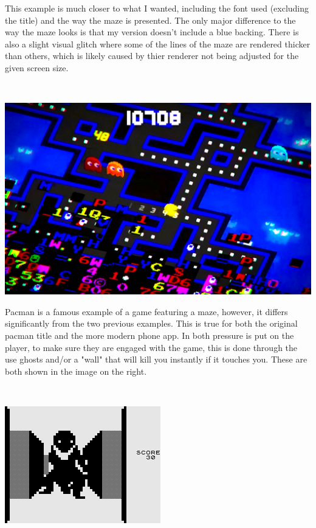 \documentclass{article}
\begin{document}
\begin{minipage}{0.5\textwidth}\raggedright
This example is much closer to what I wanted, including the font used (excluding the title) and the way the maze is presented. The only major difference to the way
the maze looks is that my version doesn't include a blue backing. There is also a slight visual glitch where some of the lines of the maze are rendered thicker than others,
which is likely caused by thier renderer not being adjusted for the given screen size.
\end{minipage}
\linebreak
\\
\linebreak
\begin{minipage}{0.4\textwidth}
\includegraphics[scale=0.115]{pacman}
\end{minipage}
\begin{minipage}{0.5\textwidth}\raggedright
Pacman is a famous example of a game featuring a maze, however, it differs significantly from the two previous examples. This is true for both the original pacman title and the more modern phone app. In both pressure is put on the player, to make sure they are engaged with the game, this is done through the use ghosts and/or a "wall" that will kill you instantly if it touches you. 
These are both shown in the image on the right. 
\end{minipage}
\linebreak
\\
\linebreak
\begin{minipage}{0.4\textwidth}
\includegraphics[scale=0.76]{monster maze}
\end{minipage}
\end{document}
